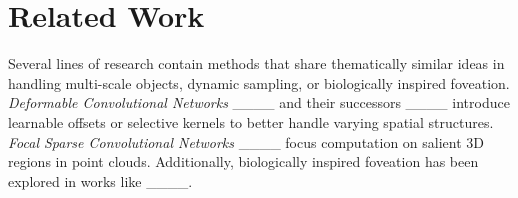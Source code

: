 \section{Related Work}
Several lines of research contain methods that share thematically similar ideas in handling multi-scale objects, dynamic sampling, or biologically inspired foveation.
\emph{Deformable Convolutional Networks} ____ and their successors ____ introduce learnable offsets or selective kernels to better handle varying spatial structures.
\emph{Focal Sparse Convolutional Networks} ____ focus computation on salient 3D regions in point clouds. Additionally, biologically inspired foveation has been explored in works like ____.